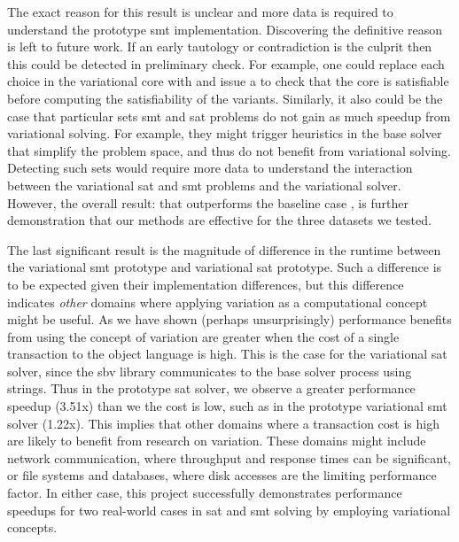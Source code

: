The exact reason for this result is unclear and more data is required to
understand the prototype \ac{smt} implementation. Discovering the definitive
reason is left to future work. If an early tautology or contradiction is the
culprit then this could be detected in preliminary check. For example, one could
replace each choice in the variational core with \tru{} and issue a
 to check that the core is satisfiable before computing the
satisfiability of the variants. Similarly, it also could be the case that
particular sets \ac{smt} and \ac{sat} problems do not gain as much speedup from
variational solving. For example, they might trigger heuristics in the base
solver that simplify the problem space, and thus do not benefit from variational
solving. Detecting such sets would require more data to understand the
interaction between the variational \ac{sat} and \ac{smt} problems and the
variational solver. However, the overall result: that \vTov{} outperforms the
baseline case \vTop{}, is further demonstration that our methods are effective
for the three datasets we tested.

The last significant result is the magnitude of difference in the runtime
between the variational \ac{smt} prototype and variational \ac{sat} prototype.
Such a difference is to be expected given their implementation differences, but
this difference indicates \emph{other} domains where applying variation as a
computational concept might be useful. As we have shown (perhaps unsurprisingly)
performance benefits from using the concept of variation are greater when the
cost of a single transaction to the object language is high. This is the case
for the variational \ac{sat} solver, since the sbv library communicates to the
base solver process using strings. Thus in the prototype \ac{sat} solver, we
observe a greater performance speedup (3.51x) than we the cost is low, such as
in the prototype variational \ac{smt} solver (1.22x). This implies that other
domains where a transaction cost is high are likely to benefit from research on
variation. These domains might include network communication, where throughput
and response times can be significant, or file systems and databases, where disk
accesses are the limiting performance factor. In either case, this project
successfully demonstrates performance speedups for two real-world cases in
\ac{sat} and \ac{smt} solving by employing variational concepts.
